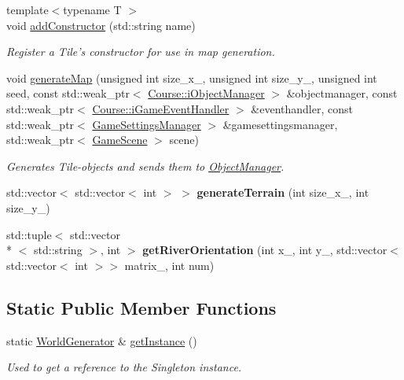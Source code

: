 \begin{DoxyCompactItemize}
\item 
{\footnotesize template$<$typename T $>$ }\\void \hyperlink{class_student_1_1_world_generator_a92f8fc6aad2ac25fcec0cc6da8a2cfb7}{add\-Constructor} (std\-::string name)
\begin{DoxyCompactList}\small\item\em Register a Tile's constructor for use in map generation. \end{DoxyCompactList}\item 
void \hyperlink{class_student_1_1_world_generator_a8818f0325419df233797c45f6a41c45f}{generate\-Map} (unsigned int size\-\_\-x\-\_\-, unsigned int size\-\_\-y\-\_\-, unsigned int seed, const std\-::weak\-\_\-ptr$<$ \hyperlink{class_course_1_1i_object_manager}{Course\-::i\-Object\-Manager} $>$ \&objectmanager, const std\-::weak\-\_\-ptr$<$ \hyperlink{class_course_1_1i_game_event_handler}{Course\-::i\-Game\-Event\-Handler} $>$ \&eventhandler, const std\-::weak\-\_\-ptr$<$ \hyperlink{class_student_1_1_game_settings_manager}{Game\-Settings\-Manager} $>$ \&gamesettingsmanager, std\-::weak\-\_\-ptr$<$ \hyperlink{class_student_1_1_game_scene}{Game\-Scene} $>$ scene)
\begin{DoxyCompactList}\small\item\em Generates Tile-\/objects and sends them to \hyperlink{class_student_1_1_object_manager}{Object\-Manager}. \end{DoxyCompactList}\item 
\hypertarget{class_student_1_1_world_generator_a3b6e8481c062618414c13a9a1dc870b0}{std\-::vector$<$ std\-::vector$<$ int $>$ $>$ {\bfseries generate\-Terrain} (int size\-\_\-x\-\_\-, int size\-\_\-y\-\_\-)}\label{class_student_1_1_world_generator_a3b6e8481c062618414c13a9a1dc870b0}

\item 
\hypertarget{class_student_1_1_world_generator_ac78c6a45fb9fa988c2112d87df3c1476}{std\-::tuple$<$ std\-::vector\\*
$<$ std\-::string $>$, int $>$ {\bfseries get\-River\-Orientation} (int x\-\_\-, int y\-\_\-, std\-::vector$<$ std\-::vector$<$ int $>$$>$ matrix\-\_\-, int num)}\label{class_student_1_1_world_generator_ac78c6a45fb9fa988c2112d87df3c1476}

\end{DoxyCompactItemize}
\subsection*{Static Public Member Functions}
\begin{DoxyCompactItemize}
\item 
static \hyperlink{class_student_1_1_world_generator}{World\-Generator} \& \hyperlink{class_student_1_1_world_generator_a6683dd891813cf7335ec650f9bfc349d}{get\-Instance} ()
\begin{DoxyCompactList}\small\item\em Used to get a reference to the Singleton instance. \end{DoxyCompactList}\end{DoxyCompactItemize}


